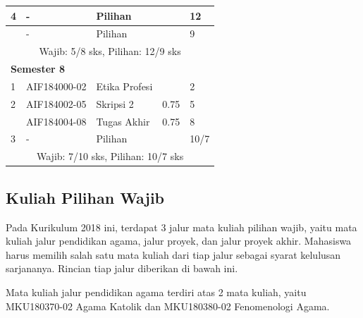 \begin{table}[H]
\begin{tabular}{|p{0.5cm}|p{2.85cm}|p{4.95cm}|p{2.7cm}|p{2.7cm}|}
			4	& - &	Pilihan	& &	12  \\ \hline
				& - &	Pilihan	& &	9  \\ \hline
			\multicolumn{5}{|c|}{Wajib: 5/8 sks, Pilihan: 12/9 sks} \\ \hline
			\multicolumn{5}{|l|}{\textbf{Semester 8}} \\ \hline
			1 &	AIF184000-02 &	Etika Profesi &	&	2  \\ \hline
			2 &	AIF184002-05 &	Skripsi 2 &	0.75 &	5  \\ \hline
			 & AIF184004-08 &	Tugas Akhir &	0.75 &	8  \\ \hline
			3 &	- &	Pilihan	&  &	10/7  \\ \hline
			\multicolumn{5}{|c|}{Wajib: 7/10 sks, Pilihan: 10/7 sks} \\ \hline
		\end{tabular}
	\label{tab:2_strukturkurikulum2018}
\end{table}

\subsection{Kuliah Pilihan Wajib}

Pada Kurikulum 2018 ini, terdapat 3 jalur mata kuliah pilihan wajib, yaitu mata kuliah jalur pendidikan agama, jalur proyek, dan jalur proyek akhir. Mahasiswa harus memilih salah satu mata kuliah dari tiap jalur sebagai syarat kelulusan sarjananya. Rincian tiap jalur diberikan di bawah ini.

Mata kuliah jalur pendidikan agama terdiri atas 2 mata kuliah, yaitu MKU180370-02 Agama Katolik dan MKU180380-02 Fenomenologi Agama.
 
